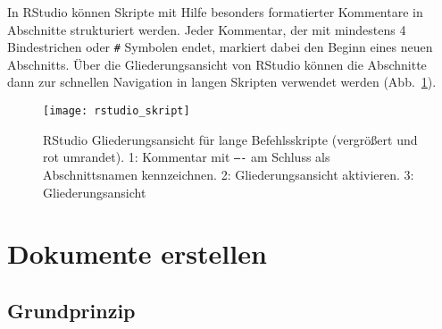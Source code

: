 In RStudio können Skripte mit Hilfe besonders formatierter Kommentare in Abschnitte strukturiert werden. Jeder Kommentar, der mit mindestens 4 Bindestrichen oder \lstinline!#! Symbolen endet, markiert dabei den Beginn eines neuen Abschnitts. Über die Gliederungsansicht von RStudio können die Abschnitte dann zur schnellen Navigation in langen Skripten verwendet werden (Abb.\ \ref{fig:rstudio_skript}).

\begin{figure}[ht]
\centering
\texttt{[image: rstudio\_skript]}
\vspace*{-0.5em}
\caption{RStudio Gliederungsansicht für lange Befehlsskripte (vergrößert und rot umrandet). 1: Kommentar mit \texttt{----} am Schluss als Abschnittsnamen kennzeichnen. 2: Gliederungsansicht aktivieren. 3: Gliederungsansicht}
\label{fig:rstudio_skript}
\end{figure}

\section{Dokumente erstellen}
\label{sec:rmd}


\subsection{Grundprinzip}

